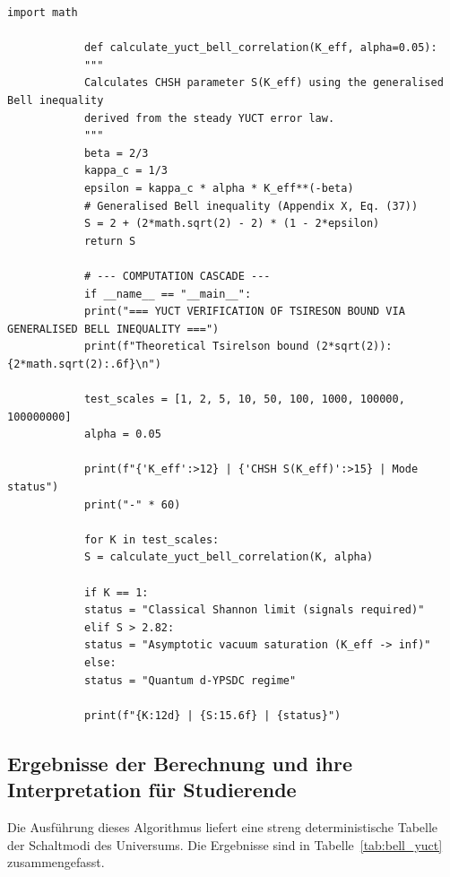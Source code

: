 \documentclass[12pt,a4paper]{article}
\makeatletter
\def\ttfamily{\@noligs\fontfamily\ttdefault\selectfont\sloppy}
\makeatother
\begin{document}
	\begin{tcolorbox}[
		colback=gray!5, 
		colframe=black!75, 
		title=YUCT Python-Code: Tsirelson-Schranke über generalisierte Bell-Ungleichung,
		fonttitle=\small\ttfamily,
		arc=2mm,
		fontupper=\scriptsize,
		left=1mm, right=1mm,
		top=1mm, bottom=1mm
		]
		\begin{lstlisting}[basicstyle=\scriptsize\ttfamily, breaklines=true, columns=fullflexible]
			import math
			
			def calculate_yuct_bell_correlation(K_eff, alpha=0.05):
			"""
			Calculates CHSH parameter S(K_eff) using the generalised Bell inequality
			derived from the steady YUCT error law.
			"""
			beta = 2/3
			kappa_c = 1/3
			epsilon = kappa_c * alpha * K_eff**(-beta)
			# Generalised Bell inequality (Appendix X, Eq. (37))
			S = 2 + (2*math.sqrt(2) - 2) * (1 - 2*epsilon)
			return S
			
			# --- COMPUTATION CASCADE ---
			if __name__ == "__main__":
			print("=== YUCT VERIFICATION OF TSIRESON BOUND VIA GENERALISED BELL INEQUALITY ===")
			print(f"Theoretical Tsirelson bound (2*sqrt(2)): {2*math.sqrt(2):.6f}\n")
			
			test_scales = [1, 2, 5, 10, 50, 100, 1000, 100000, 100000000]
			alpha = 0.05
			
			print(f"{'K_eff':>12} | {'CHSH S(K_eff)':>15} | Mode status")
			print("-" * 60)
			
			for K in test_scales:
			S = calculate_yuct_bell_correlation(K, alpha)
			
			if K == 1:
			status = "Classical Shannon limit (signals required)"
			elif S > 2.82:
			status = "Asymptotic vacuum saturation (K_eff -> inf)"
			else:
			status = "Quantum d-YPSDC regime"
			
			print(f"{K:12d} | {S:15.6f} | {status}")
		\end{lstlisting}
	\end{tcolorbox}
	
	\subsection{Ergebnisse der Berechnung und ihre Interpretation für Studierende}
	
	Die Ausführung dieses Algorithmus liefert eine streng deterministische Tabelle der Schaltmodi des Universums. Die Ergebnisse sind in Tabelle~\ref{tab:bell_yuct} zusammengefasst.
	
\end{document}
